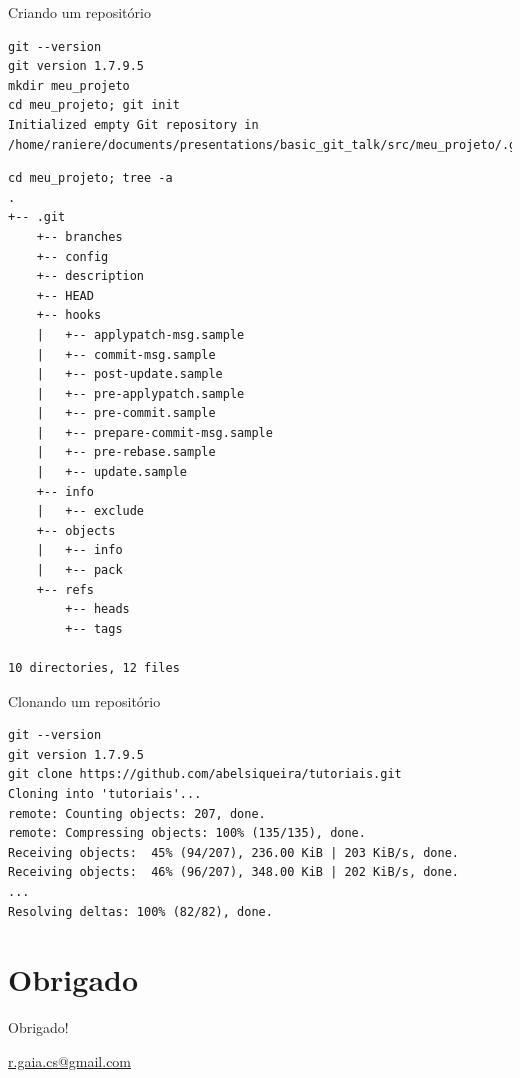 \documentclass[11pt]{beamer}
\begin{document}
\begin{frame}[fragile]{Criando um repositório}
    \begin{lstlisting}
git --version
git version 1.7.9.5
mkdir meu_projeto
cd meu_projeto; git init
Initialized empty Git repository in /home/raniere/documents/presentations/basic_git_talk/src/meu_projeto/.git/
    \end{lstlisting}
\end{frame}

\begin{frame}[fragile]
    \begin{lstlisting}
cd meu_projeto; tree -a
.
+-- .git
    +-- branches
    +-- config
    +-- description
    +-- HEAD
    +-- hooks
    |   +-- applypatch-msg.sample
    |   +-- commit-msg.sample
    |   +-- post-update.sample
    |   +-- pre-applypatch.sample
    |   +-- pre-commit.sample
    |   +-- prepare-commit-msg.sample
    |   +-- pre-rebase.sample
    |   +-- update.sample
    +-- info
    |   +-- exclude
    +-- objects
    |   +-- info
    |   +-- pack
    +-- refs
        +-- heads
        +-- tags

10 directories, 12 files
    \end{lstlisting}
\end{frame}

\begin{frame}[fragile]{Clonando um repositório}
    \begin{lstlisting}
git --version
git version 1.7.9.5
git clone https://github.com/abelsiqueira/tutoriais.git
Cloning into 'tutoriais'...
remote: Counting objects: 207, done.
remote: Compressing objects: 100% (135/135), done.
Receiving objects:  45% (94/207), 236.00 KiB | 203 KiB/s, done.
Receiving objects:  46% (96/207), 348.00 KiB | 202 KiB/s, done.
...
Resolving deltas: 100% (82/82), done.
    \end{lstlisting}
\end{frame}
\section*{Obrigado}
\begin{frame}
    \begin{center}
        Obrigado!
    \end{center}
    \begin{center}
        \url{r.gaia.cs@gmail.com}
    \end{center}
\end{frame}
\end{document}
